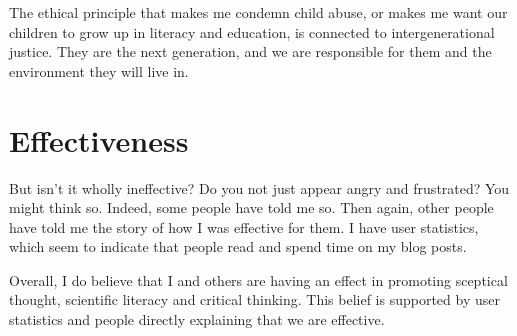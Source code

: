 \begin{multicols}{2}
The ethical principle that makes me condemn child abuse, or makes me want our children to grow up in literacy and education, is connected to
intergenerational justice. They are the next generation, and we are responsible for them and the environment they will live in. 

\section{Effectiveness}

But isn't it wholly ineffective? Do you not just appear angry and frustrated? You might think so. Indeed, some people have told me so. Then again,
other people have told me the story of how I was effective for them. I have user statistics, which seem to indicate that people read and spend time
on my blog posts. 


Overall, I do believe that I and others are having an effect in promoting sceptical thought, scientific literacy and critical thinking. This belief
is supported by user statistics and people directly explaining that we are effective. 

\end{multicols}